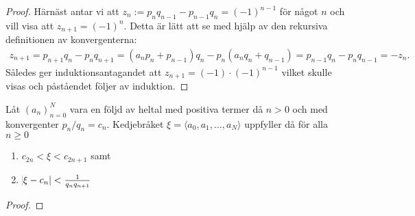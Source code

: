 \begin{proof}
    Härnäst antar vi att \(z_n := p_n q_{n-1} - p_{n-1} q_n = (-1)^{n-1}\) för något $n$ och vill visa att \(z_{n+1} = (-1)^{n}\). Detta är lätt att se med hjälp av den rekursiva definitionen av konvergenterna:
    \begin{align*}
        z_{n+1} = p_{n+1} q_{n} - p_{n} q_{n+1} = (a_n p_n + p_{n-1}) q_n - p_{n} (a_n q_n + q_{n-1}) = p_{n-1} q_n - p_n q_{n-1} = - z_n.
    \end{align*}
    Således ger induktionsantagandet att \(z_{n+1} = (-1) \cdot (-1)^{n-1}\) vilket skulle visas och påståendet följer av induktion. 
\end{proof}


\begin{theorem} \label{app.kovfel}
    Låt \((a_n)_{n=0}^{N}\) vara en följd av heltal med positiva termer då \(n > 0\) och med konvergenter \(p_n / q_n = c_n\). Kedjebråket \(\xi = \langle a_0, a_1, \dots, a_N \rangle\) uppfyller då för alla \(n \geq 0\)
    \begin{enumerate}
        \item \(c_{2n} < \xi < c_{2n + 1}\) samt
        \item \(\abs{\xi - c_n} < \frac{1}{q_n q_{n + 1}}\) %
    \end{enumerate}
\end{theorem}
\begin{proof}
\end{proof}

